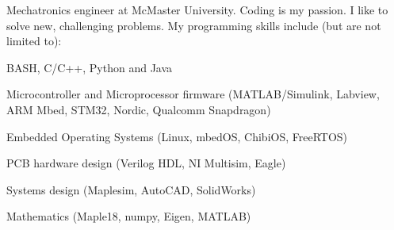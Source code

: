 
\begin{cvparagraph}

Mechatronics engineer at McMaster University. \newline
Coding is my passion. \newline
I like to solve new, challenging problems. \newline
My programming skills include (but are not limited to): \newline
\begin{cvitems}
  \item BASH, C/C++, Python and Java
  \item Microcontroller and Microprocessor firmware (MATLAB/Simulink, Labview, ARM Mbed, STM32, Nordic, Qualcomm Snapdragon)
  \item Embedded Operating Systems (Linux, mbedOS, ChibiOS, FreeRTOS)
  \item PCB hardware design (Verilog HDL, NI Multisim, Eagle)
  \item Systems design (Maplesim, AutoCAD, SolidWorks)
  \item Mathematics (Maple18, numpy, Eigen, MATLAB)
\end{cvitems}
\end{cvparagraph}

